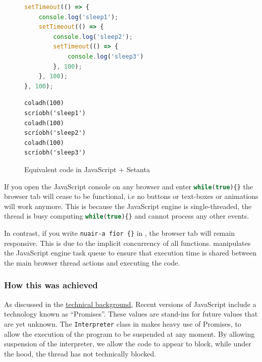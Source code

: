 \begin{figure}[ht]
    \begin{minipage}[t]{0.45\textwidth}
        \begin{lstlisting}[language=javascript, caption=JavaScript]
setTimeout(() => {
    console.log('sleep1');
    setTimeout(() => {
        console.log('sleep2');
        setTimeout(() => {
            console.log('sleep3')
        }, 100);
    }, 100);
}, 100);
        \end{lstlisting}
    \end{minipage}\qquad
    \begin{minipage}[t]{0.45\textwidth}
        \begin{lstlisting}[language=setanta, caption=Setanta]
coladh(100)
scríobh('sleep1')
coladh(100)
scríobh('sleep2')
coladh(100)
scríobh('sleep3')
        \end{lstlisting}
    \end{minipage}
    \caption{Equivalent code in JavaScript + Setanta}
    \label{blockingcomparison}
\end{figure}

If you open the JavaScript console on any browser and enter \lstinline[language=javascript]|while(true){}| the browser tab will cease to be functional, i.e no buttons or text-boxes or animations will work anymore.
This is because the JavaScript engine is single-threaded, the thread is busy computing \lstinline[language=javascript]|while(true){}| and cannot process any other events.

In contrast, if you write \lstinline[language=setanta]|nuair-a fíor {}| in \Setanta{}, the browser tab will remain responsive. This is due to the implicit concurrency of all \Setanta{} functions. \Setanta{} manipulates the JavaScript engine task queue to ensure that execution time is shared between the main browser thread actions and executing the \Setanta{} code.

\subsubsection{How this was achieved}

As discussed in the \hyperref[background:asyncawait]{technical background}, Recent versions of JavaScript include a technology known as ``Promises''. These values are stand-ins for future values that are yet unknown. The \verb|Interpreter| class in \Setanta{} makes heavy use of Promises, to allow the execution of the program to be suspended at any moment. By allowing suspension of the interpreter, we allow the code to appear to block, while under the hood, the thread has not technically blocked.

